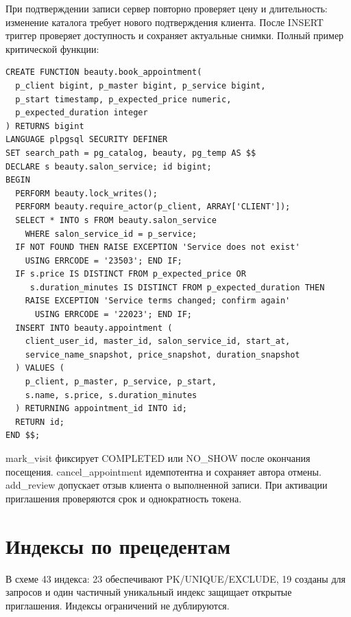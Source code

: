 \documentclass[11pt,a4paper]{article}
\begin{document}
При подтверждении записи сервер повторно проверяет цену и длительность: изменение каталога требует нового подтверждения клиента. После INSERT триггер проверяет доступность и сохраняет актуальные снимки. Полный пример критической функции:


\begin{lstlisting}[style=sql]
CREATE FUNCTION beauty.book_appointment(
  p_client bigint, p_master bigint, p_service bigint,
  p_start timestamp, p_expected_price numeric,
  p_expected_duration integer
) RETURNS bigint
LANGUAGE plpgsql SECURITY DEFINER
SET search_path = pg_catalog, beauty, pg_temp AS $$
DECLARE s beauty.salon_service; id bigint;
BEGIN
  PERFORM beauty.lock_writes();
  PERFORM beauty.require_actor(p_client, ARRAY['CLIENT']);
  SELECT * INTO s FROM beauty.salon_service
    WHERE salon_service_id = p_service;
  IF NOT FOUND THEN RAISE EXCEPTION 'Service does not exist'
    USING ERRCODE = '23503'; END IF;
  IF s.price IS DISTINCT FROM p_expected_price OR
     s.duration_minutes IS DISTINCT FROM p_expected_duration THEN
    RAISE EXCEPTION 'Service terms changed; confirm again'
      USING ERRCODE = '22023'; END IF;
  INSERT INTO beauty.appointment (
    client_user_id, master_id, salon_service_id, start_at,
    service_name_snapshot, price_snapshot, duration_snapshot
  ) VALUES (
    p_client, p_master, p_service, p_start,
    s.name, s.price, s.duration_minutes
  ) RETURNING appointment_id INTO id;
  RETURN id;
END $$;
\end{lstlisting}


{\raggedright mark\_\allowbreak{}visit фиксирует COMPLETED или NO\_SHOW после окончания посещения. cancel\_\allowbreak{}appointment идемпотентна и сохраняет автора отмены. add\_\allowbreak{}review допускает отзыв клиента о выполненной записи. При активации приглашения проверяются срок и однократность токена.\par}

\section{Индексы по прецедентам}
В схеме 43 индекса: 23 обеспечивают PK/UNIQUE/EXCLUDE, 19 созданы для запросов и один частичный уникальный индекс защищает открытые приглашения. Индексы ограничений не дублируются.
\end{document}
